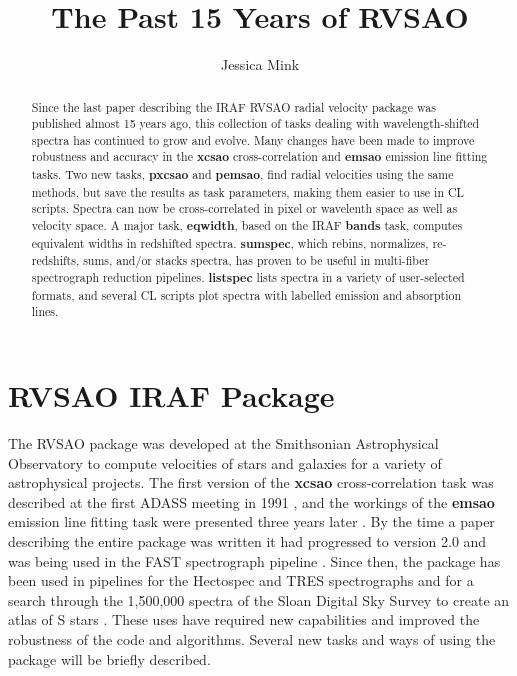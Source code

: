 \documentclass[11pt,twoside]{article}
\begin{document}
\title{The Past 15 Years of RVSAO}
\author{Jessica Mink}

\begin{abstract}
Since the last paper describing the IRAF RVSAO radial velocity package
was published almost 15 years ago, this collection of tasks dealing
with wavelength-shifted spectra has continued to grow and evolve.
Many changes have been made to improve robustness and accuracy
in the \textbf{xcsao} cross-correlation and \textbf{emsao} emission line fitting tasks.
Two new tasks, \textbf{pxcsao} and \textbf{pemsao}, find radial velocities using the same
methods, but save the results as task parameters, making them easier to
use in CL scripts.  Spectra can now be cross-correlated in pixel or
wavelenth space as well as velocity space.  A major task, \textbf{eqwidth}, based
on the IRAF \textbf{bands} task, computes equivalent widths in redshifted spectra.
\textbf{sumspec}, which rebins, normalizes, re-redshifts, sums, and/or stacks
spectra, has proven to be useful in multi-fiber spectrograph reduction
pipelines.  \textbf{listspec} lists spectra in a variety of user-selected formats,
and several CL scripts plot spectra with labelled emission and absorption
lines. 

\end{abstract}

\section*{RVSAO IRAF Package}

The RVSAO package was developed at the Smithsonian Astrophysical
Observatory to compute velocities of stars and galaxies for a variety
of astrophysical projects.  The first version of the \textbf{xcsao}
cross-correlation task was described at the first ADASS meeting in 1991
\citep{xcsao_1991},
and the workings of the \textbf{emsao} emission line fitting task were
presented three years later
\citep{1995ASPC...77..496M}.
By the time a paper describing the entire package was written
\citep{1998PASP..110..934K}
it had progressed to version 2.0 and was being used in the FAST
spectrograph pipeline
\citep{1997ASPC..125..140T}.  Since then, the package has been used in
pipelines for the Hectospec
\citep{2007ASPC..376..249M}
and TRES
\citep{2011ASPC..442..305M}
spectrographs and for a search through the 1,500,000 spectra of the
Sloan Digital Sky Survey to create an atlas of S stars
\citep{2011AAS...21715303O}.  These uses have required new capabilities
and improved the robustness of the code and algorithms.  Several new
tasks and ways of using the package will be briefly described.
\end{document}
